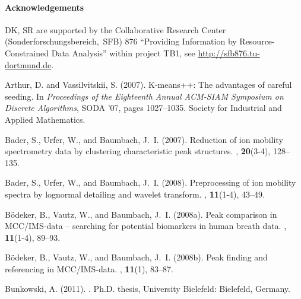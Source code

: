 \documentclass{article}
\begin{document}
\paragraph*{Acknowledgements}
DK, SR are supported by the Collaborative Research Center (Sonderforschungsbereich,~SFB) 876 ``Providing Information by Resource-Constrained Data Analysis'' within project TB1, see \url{http://sfb876.tu-dortmund.de}.

\begin{thebibliography}{}

Arthur, D. and Vassilvitskii, S. (2007).
\newblock K-means++: The advantages of careful seeding.
\newblock In {\em Proceedings of the Eighteenth Annual ACM-SIAM Symposium on
  Discrete Algorithms\/}, SODA '07, pages 1027--1035. Society for Industrial
  and Applied Mathematics.

Bader, S., Urfer, W., and Baumbach, J.~I. (2007).
\newblock Reduction of ion mobility spectrometry data by clustering
  characteristic peak structures.
, {\bf 20}(3-4), 128--135.

Bader, S., Urfer, W., and Baumbach, J.~I. (2008).
\newblock Preprocessing of ion mobility spectra by lognormal detailing and
  wavelet transform.
, {\bf
  11}(1-4), 43--49.

B{\"o}deker, B., Vautz, W., and Baumbach, J.~I. (2008a).
\newblock Peak comparison in {MCC/IMS}-data -- searching for potential
  biomarkers in human breath data.
, {\bf
  11}(1-4), 89--93.

B{\"o}deker, B., Vautz, W., and Baumbach, J.~I. (2008b).
\newblock Peak finding and referencing in {MCC}/{IMS}-data.
, {\bf
  11}(1), 83--87.

Bunkowski, A. (2011).
.
\newblock Ph.D. thesis, University Bielefeld: Bielefeld, Germany.


\end{thebibliography}
\end{document}
